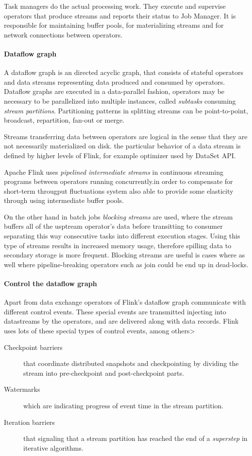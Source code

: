 Task managers do the actual processing work. They execute and supervise operators that produce streams and reports their status to Job Manager. It is responsible for maintaining buffer pools, for materializing streams and for network connections between operators.   

\paragraph{Dataflow graph}
A dataflow graph is an directed acyclic graph, that consists of stateful operators and data streams representing data produced and consumed by operators.
Dataflow graphs are executed in a data-parallel fashion, operators may be necessary to be parallelized into multiple instances, called \textit{subtasks} consuming \textit{stream partitions}. Partitioning patterns in splitting streams can be point-to-point, broadcast, repartition, fan-out or merge.

Streams transferring data between operators are logical in the sense that they are not necessarily materialized on disk. the particular behavior of a data stream is defined by higher levels of Flink, for example optimizer used by DataSet API.

Apache Flink uses \textit{pipelined intermediate streams} in continuous streaming programs between operators running concurrently.in order to compensate for short-term througput fluctuations system also able to provide some elasticity through using intermediate buffer pools.  

On the other hand in batch jobs \textit{blocking streams} are used, where the stream buffers all of the usptream operator's data before transitting to consumer separating this way consecutive tasks into different execution stages. Using 
 this type of streams results in increased memory usage, therefore spilling data to secondary storage is more frequent. Blocking streams are useful is cases where as well where pipeline-breaking operators such as join\cite{distributedjoin} could be end up in dead-locks.

\paragraph{Control the dataflow graph}
Apart from data exchange operators of Flink's dataflow graph communicate with different control events. These special events are transmitted injecting into datastreams by the operators, and are delivered along with data records. Flink uses lots of these special types of control events, among others>
\begin{description}
\item[Checkpoint barriers]that coordinate distributed snapshots and checkpointing by dividing the stream into pre-checkpoint and post-checkpoint parts.
\item[Watermarks] which are indicating progress of event time in the stream partition.
\item[Iteration barriers] that signaling that a stream partition  has reached the end of a \textit{superstep} in iterative algorithms.
\end{description}

